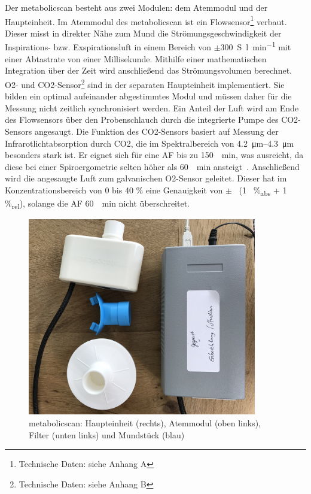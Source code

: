 Der metabolicscan besteht aus zwei Modulen: dem Atemmodul und der Haupteinheit. Im Atemmodul des metabolicscan ist ein Flowsensor\footnote{Technische Daten: siehe Anhang A} verbaut. Dieser misst in direkter Nähe zum Mund die Strömungsgeschwindigkeit der Inspirations- bzw. Exspirationsluft in einem Bereich von $\pm$\SI{300}{S\litre\per\minute} mit einer Abtastrate von einer Millisekunde. Mithilfe einer mathematischen Integration über der Zeit wird anschließend das Strömungsvolumen berechnet. \acs{O2}- und \acs{CO2}-Sensor\footnote{Technische Daten: siehe Anhang B} sind in der separaten Haupteinheit implementiert. Sie bilden ein optimal aufeinander abgestimmtes Modul und müssen daher für die Messung nicht zeitlich synchronisiert werden. Ein Anteil der Luft wird am Ende des Flowsensors über den Probenschlauch durch die integrierte Pumpe des \acs{CO2}-Sensors angesaugt. Die Funktion des \acs{CO2}-Sensors basiert auf Messung der Infrarotlichtabsorption durch \acs{CO2}, die im Spektralbereich von \SIrange{4,2}{4,3}{\micro\metre} besonders stark ist. Er eignet sich für eine \ac{AF} bis zu \SI{150}{\per\minute}, was ausreicht, da diese bei einer Spiroergometrie selten höher als \SI{60}{\per\minute} ansteigt~\cite{Hollmann.2006}. Anschließend wird die angesaugte Luft zum galvanischen \acs{O2}-Sensor geleitet. Dieser hat im Konzentrationsbereich von 0 bis 40 \% eine Genauigkeit von $\pm$~ (1~ \%\textsubscript{abs} + 1 \%\textsubscript{rel}), solange die \acs{AF} \SI{60}{\per\minute} nicht überschreitet.

\begin{figure}[H]
	\centering
	\includegraphics[width=100mm]{Bilder/mbs.jpg}
	\caption[metabolicscan: Haupteinheit, Atemmodul, Filter und Mundstück]{metabolicscan: Haupteinheit (rechts), Atemmodul (oben links), Filter (unten links) und Mundstück (blau)}
	\label{pic:pic9}
\end{figure}

